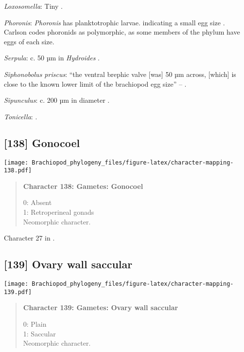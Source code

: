 \documentclass[openany]{book}
\theoremstyle{definition}
\theoremstyle{definition}
\theoremstyle{definition}
\theoremstyle{remark}
\begin{document}
\hypertarget{Loxosomella-coding-137}{}
\emph{Loxosomella}: Tiny \citep{Nielsen1966}.

\hypertarget{Phoronis-coding-137}{}
\emph{Phoronis}: \emph{Phoronis} has planktotrophic larvae. indicating a
small egg size \citep{Ruppert2004Invertebratezoology}. Carlson
\citeyearpar{Carlson1995Phylogeneticrelationships} codes phoronids as
polymorphic, as some members of the phylum have eggs of each size.

\hypertarget{Serpula-coding-137}{}
\emph{Serpula}: c. 50 µm in \emph{Hydroides} \citep{Miles2007}.

\hypertarget{Siphonobolus_priscus-coding-137}{}
\emph{Siphonobolus priscus}: ``the ventral brephic valve {[}was{]} 50 µm
across, {[}which{]} is close to the known lower limit of the brachiopod
egg size'' -- \citet{Popov2009Earlyontogeny}.

\hypertarget{Sipunculus-coding-137}{}
\emph{Sipunculus}: c. 200 µm in diameter \citep{Rice1988}.

\hypertarget{Tonicella-coding-137}{}
\emph{Tonicella}: \citet{BucklandNicks1988}.

\subsection*{{[}138{]} Gonocoel}\label{gonocoel}

\texttt{[image: Brachiopod\_phylogeny\_files/figure-latex/character-mapping-138.pdf]}

\begin{quote}
\textbf{Character 138: Gametes: Gonocoel}

0: Absent\\
1: Retroperineal gonads\\
Neomorphic character.
\end{quote}

Character 27 in \citet{Haszprunar1996}.

\subsection*{{[}139{]} Ovary wall saccular}\label{ovary-wall-saccular}

\texttt{[image: Brachiopod\_phylogeny\_files/figure-latex/character-mapping-139.pdf]}

\begin{quote}
\textbf{Character 139: Gametes: Ovary wall saccular}

0: Plain\\
1: Saccular\\
Neomorphic character.
\end{quote}
\end{document}
